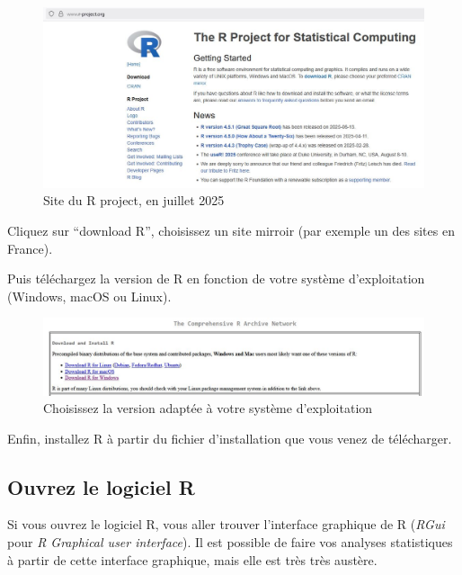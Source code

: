\documentclass[
]{book}
\begin{document}
\begin{figure}

{\centering \includegraphics[width=1\linewidth]{./images/telecharger_R_1} 

}

\caption{Site du R project, en juillet 2025}\label{fig:dlR1}
\end{figure}

Cliquez sur ``download R'', choisissez un site mirroir (par exemple un des sites en France).

Puis téléchargez la version de R en fonction de votre système d'exploitation (Windows, macOS ou Linux).

\begin{figure}

{\centering \includegraphics[width=1\linewidth]{./images/telecharger_R_2} 

}

\caption{Choisissez la version adaptée à votre système d'exploitation}\label{fig:dlR2}
\end{figure}

Enfin, installez R à partir du fichier d'installation que vous venez de télécharger.

\subsection{Ouvrez le logiciel R}\label{ouvrez-le-logiciel-r}

Si vous ouvrez le logiciel R, vous aller trouver l'interface graphique de R (\emph{RGui} pour \emph{R Graphical user interface}). Il est possible de faire vos analyses statistiques à partir de cette interface graphique, mais elle est très très austère.
\end{document}
